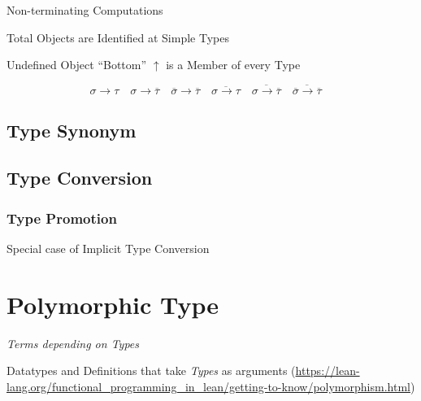 \cite{thompson99}

Non-terminating Computations

Total Objects are Identified at Simple Types

Undefined Object ``Bottom'' $\uparrow$ is a Member of every Type

\[
  \sigma \rightarrow \tau \quad
  \sigma \rightarrow \overline{\tau} \quad
  \overline{\sigma} \rightarrow \overline{\tau} \quad
  \overline{\sigma \rightarrow \tau} \quad
  \overline{\sigma \rightarrow \overline{\tau}} \quad
  \overline{\overline{\sigma} \rightarrow \overline{\tau}} \quad
\]



\subsection{Type Synonym}\label{sec:type_synonym}

\subsection{Type Conversion}\label{sec:type_conversion}

\subsubsection{Type Promotion}\label{sec:type_promotion}

Special case of Implicit Type Conversion



\section{Polymorphic Type}\label{sec:polymorphic_type}

\emph{Terms depending on Types}

Datatypes and Definitions that take \emph{Types} as arguments
(\url{https://lean-lang.org/functional_programming_in_lean/getting-to-know/polymorphism.html})

